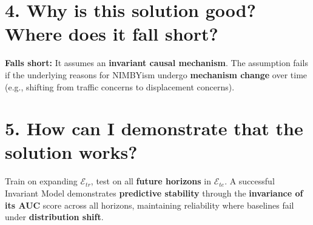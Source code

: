 \documentclass[11pt]{article}
\begin{document}
\section*{4. Why is this solution good? Where does it fall short?}
\textbf{Falls short:} It assumes an \textbf{invariant causal mechanism}. The assumption fails if the underlying reasons for NIMBYism undergo \textbf{mechanism change} over time (e.g., shifting from traffic concerns to displacement concerns).

\section*{5. How can I demonstrate that the solution works?}
Train on expanding $\mathcal{E}_{tr}$, test on all \textbf{future horizons} in $\mathcal{E}_{te}$. A successful Invariant Model demonstrates \textbf{predictive stability} through the \textbf{invariance of its AUC} score across all horizons, maintaining reliability where baselines fail under \textbf{distribution shift}.
\end{document}

